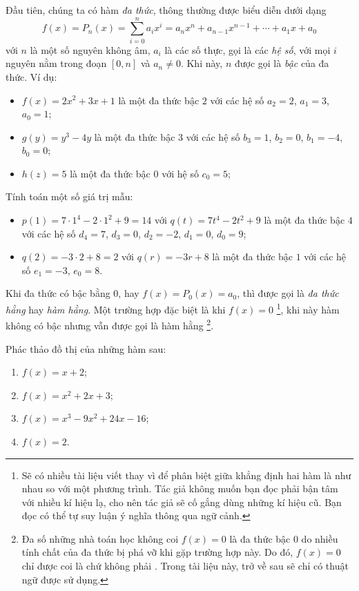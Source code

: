 Đầu tiên, chúng ta có hàm \emph{đa thức}, thông thường được biểu diễn dưới dạng $$f(x)=P_n(x)=\sum_{i = 0}^n a_i x^i = a_nx^n + a_{n-1}x^{n-1} + \cdots + a_1x + a_0$$ với $n$ là một số nguyên không âm, $a_i$ là các số thực, gọi là các \emph{hệ số}, với mọi $i$ nguyên nằm trong đoạn $[0, n]$ và $a_n \neq 0$. Khi này, $n$ được gọi là \emph{bậc} của đa thức. Ví dụ:
\begin{itemize}
   \item $f(x) = 2x^2 + 3x + 1$ là một đa thức bậc $2$ với các hệ số $a_2 = 2$, $a_1 = 3$, $a_0 = 1$;
   \item $g(y) = y^3 - 4y$ là một đa thức bậc $3$ với các hệ số $b_3 = 1$, $b_2 = 0$, $b_1 = -4$, $b_0 = 0$;
   \item $h(z) = 5$ là một đa thức bậc $0$ với hệ số $c_0 = 5$;
\end{itemize}
Tính toán một số giá trị mẫu:
\begin{itemize}
   \item $p(1) = 7 \cdot 1^4 - 2 \cdot 1^2 + 9 = 14$ với $q(t)= 7t^4 - 2t^2 + 9$ là một đa thức bậc $4$ với các hệ số $d_4 = 7$, $d_3 = 0$, $d_2 = -2$, $d_1 = 0$, $d_0 = 9$;
   \item $q(2) = -3 \cdot 2 + 8 = 2$ với $q(r) = -3r + 8$ là một đa thức bậc $1$ với các hệ số $e_1 = -3$, $e_0 = 8$.
\end{itemize}
Khi đa thức có bậc bằng $0$, hay $f(x) = P_0(x) = a_0$, thì được gọi là \emph{đa thức hằng} hay \emph{hàm hằng}. Một trường hợp đặc biệt là khi $f(x) = 0$ \footnote{Sẽ có nhiều tài liệu viết  thay vì  để phân biệt giữa khẳng định hai hàm là như nhau so với một phương trình. Tác giả không muốn bạn đọc phải bận tâm với nhiều kí hiệu lạ, cho nên tác giả sẽ cố gắng dùng những kí hiệu cũ. Bạn đọc có thể tự suy luận ý nghĩa thông qua ngữ cảnh.}, khi này hàm không có bậc nhưng vẫn được gọi là hàm hằng \footnote{Đa số những nhà toán học không coi $f(x) = 0$ là đa thức bậc $0$ do nhiều tính chất của đa thức bị phá vỡ khi gặp trường hợp này. Do đó, $f(x) = 0$ chỉ được coi là  chứ không phải . Trong tài liệu này, trở về sau sẽ chỉ có thuật ngữ  được sử dụng.}.

\exercise Phác thảo đồ thị của những hàm sau:
\begin{multicols}{2}
\begin{enumerate}
   \item $f(x) = x + 2$; 
   \item $f(x) = x^2 + 2x + 3$;
   \item $f(x) = x^3 - 9x^2 + 24x - 16$;
   \item $f(x) = 2$.
\end{enumerate}
\end{multicols}

